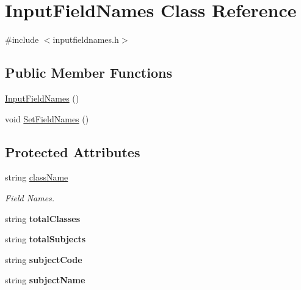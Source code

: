 \hypertarget{classInputFieldNames}{\section{Input\-Field\-Names Class Reference}
\label{classInputFieldNames}
}


{\ttfamily \#include $<$inputfieldnames.\-h$>$}

\subsection*{Public Member Functions}
\begin{DoxyCompactItemize}
\item 
\hyperlink{classInputFieldNames_a45053e8155519fdcd8218b7c6d51803c}{Input\-Field\-Names} ()
\item 
void \hyperlink{classInputFieldNames_a7f9413e1474a83378a2e29f0ceee4311}{Set\-Field\-Names} ()
\end{DoxyCompactItemize}
\subsection*{Protected Attributes}
\begin{DoxyCompactItemize}
\item 
string \hyperlink{classInputFieldNames_a171ac43b7f0c5b5ab9fad8f3417dfb5c}{class\-Name}
\begin{DoxyCompactList}\small\item\em Field Names. \end{DoxyCompactList}\item 
\hypertarget{classInputFieldNames_a7bb8018d71f6ce48a5d25500df3c0335}{string {\bfseries total\-Classes}}\label{classInputFieldNames_a7bb8018d71f6ce48a5d25500df3c0335}

\item 
\hypertarget{classInputFieldNames_a301643eaa424566636e295cb8a8e63ef}{string {\bfseries total\-Subjects}}\label{classInputFieldNames_a301643eaa424566636e295cb8a8e63ef}

\item 
\hypertarget{classInputFieldNames_a597ee6c7a7de187df580546bd09d6289}{string {\bfseries subject\-Code}}\label{classInputFieldNames_a597ee6c7a7de187df580546bd09d6289}

\item 
\hypertarget{classInputFieldNames_a4d589fac2a65e2ebbdf5fed5a38929b1}{string {\bfseries subject\-Name}}\label{classInputFieldNames_a4d589fac2a65e2ebbdf5fed5a38929b1}

\end{DoxyCompactItemize}


